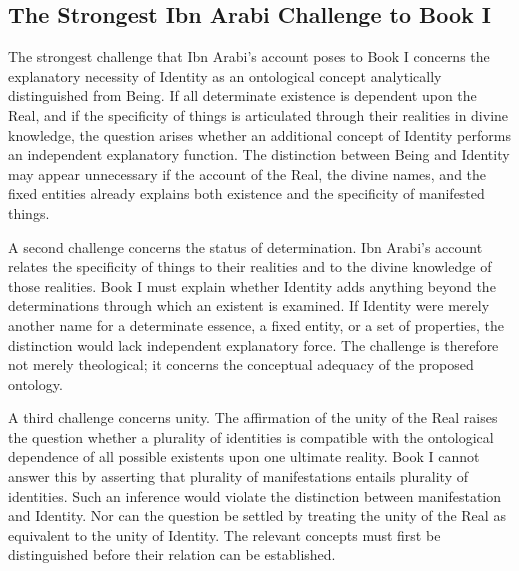 \subsection{The Strongest Ibn Arabi Challenge to Book I}
\label{subsec:ch08_s16_ss14}

\label{para:VS.B01.P01.C08.SS14.P001}

The strongest challenge that Ibn Arabi's account
poses to Book I concerns the explanatory necessity
of Identity as an ontological concept analytically
distinguished from Being. If all determinate
existence is dependent upon the Real, and if the
specificity of things is articulated through
their realities in divine knowledge, the question
arises whether an additional concept of Identity
performs an independent explanatory function.
The distinction between Being and Identity may
appear unnecessary if the account of the Real,
the divine names, and the fixed entities already
explains both existence and the specificity
of manifested things.

\label{para:VS.B01.P01.C08.SS14.P002}

A second challenge concerns the status of
determination. Ibn Arabi's account relates the
specificity of things to their realities and
to the divine knowledge of those realities.
Book I must explain whether Identity adds
anything beyond the determinations through
which an existent is examined. If Identity
were merely another name for a determinate
essence, a fixed entity, or a set of properties,
the distinction would lack independent
explanatory force. The challenge is therefore
not merely theological; it concerns the
conceptual adequacy of the proposed ontology.

\label{para:VS.B01.P01.C08.SS14.P003}

A third challenge concerns unity. The affirmation
of the unity of the Real raises the question
whether a plurality of identities is compatible
with the ontological dependence of all possible
existents upon one ultimate reality. Book I
cannot answer this by asserting that plurality
of manifestations entails plurality of identities.
Such an inference would violate the distinction
between manifestation and Identity. Nor can
the question be settled by treating the unity
of the Real as equivalent to the unity of
Identity. The relevant concepts must first
be distinguished before their relation can
be established.

